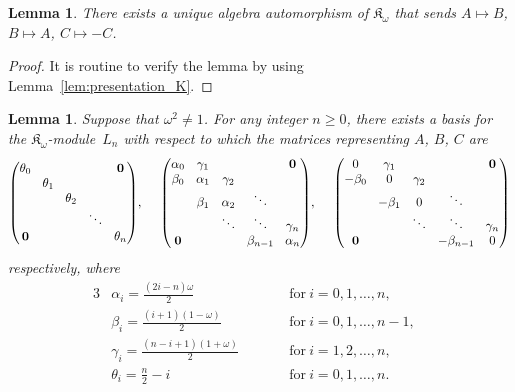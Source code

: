 \documentclass[10pt,a4paper]{amsart}
\def\K{\mathfrak K_\omega}
\numberwithin{equation}{section}
\newtheorem{Lemma}[Theorem]{Lemma}
\begin{document}
\begin{Lemma}\label{lem:auto_K}
There exists a unique algebra automorphism of $\K$ that sends
$A \mapsto B$, $B \mapsto A$, $C \mapsto -C$.
\end{Lemma}

\begin{proof}
It is routine to verify the lemma by using Lemma~\ref{lem:presentation_K}.
\end{proof}

\begin{Lemma}\label{lem2:Vn_K}
Suppose that $\omega^2\not=1$. For any integer $n\geq 0$,
there exists a basis for the $\K$-mod\-ule~$L_n$ with respect to which
the matrices representing $A$, $B$, $C$ are
\begin{gather*}%
\setlength{\arraycolsep}{4.5pt}
\begin{pmatrix}
\theta_0 & & & &{\bf 0}
\\
 &\theta_1
\\
 & &\theta_2
 \\
 & & &\ddots
 \\
{\bf 0} & & & &\theta_n
\end{pmatrix}\!,
\quad\
\begin{pmatrix}
\alpha_0 &\gamma_1 & & &{\bf 0}
\\
\beta_0 &\alpha_1 &\gamma_2
\\
&\beta_1 &\alpha_2 &\ddots
 \\
& &\ddots &\ddots &\gamma_n
 \\
{\bf 0} & & &\beta_{n-1} &\alpha_n
\end{pmatrix}\!,
\quad\
\begin{pmatrix}
0 &\gamma_1 & & &{\bf 0}
\\
-\beta_0 &0 &\gamma_2
\\
&-\beta_1 &0 &\ddots
 \\
& &\ddots &\ddots &\gamma_n
 \\
{\bf 0} & & &-\beta_{n-1} &0
\end{pmatrix}
\end{gather*}
respectively, where
\begin{alignat*}{3}
&\alpha_i=\frac{(2i-n)\omega}{2}\qquad
&&\text{for} \ i=0,1,\dots,n,&
\\
&\beta_i=\frac{(i+1)(1-\omega)}{2}\qquad
&&\text{for} \ i=0,1,\dots,n-1,&
\\
&\gamma_i=\frac{(n-i+1)(1+\omega)}{2}\qquad
&&\text{for} \ i=1,2,\dots,n,&
\\
&\theta_i=\frac{n}{2}-i
\qquad&&\text{for} \ i=0,1,\dots,n.&
\end{alignat*}
\end{Lemma}
\end{document}
